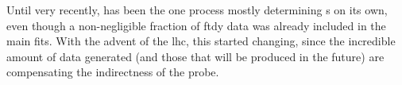 Until very recently, \dis has been the one process mostly determining \pdf{}s
on its own, even though a non-negligible fraction of \acrfull{ftdy} data was
already included in the main fits.
%
With the advent of the \acrfull{lhc}, this started changing, since the
incredible amount of data generated (and those that will be produced in the
future) are compensating the indirectness of the probe.
